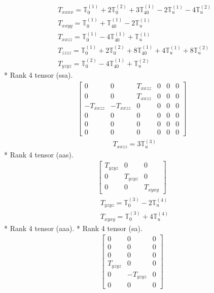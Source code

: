 \documentclass[fleqn,8pt,landscape]{jsarticle}
\begin{document}
\begin{align*}
& T_{xxxx} = \mathbb{T}_{0}^{(1)} + 2 \mathbb{T}_{0}^{(2)} + 3 \mathbb{T}_{40}^{(1)} - 2 \mathbb{T}_{u}^{(1)} - 4 \mathbb{T}_{u}^{(2)} \\
& T_{xxyy} = \mathbb{T}_{0}^{(1)} + \mathbb{T}_{40}^{(1)} - 2 \mathbb{T}_{u}^{(1)} \\
& T_{xxzz} = \mathbb{T}_{0}^{(1)} - 4 \mathbb{T}_{40}^{(1)} + \mathbb{T}_{u}^{(1)} \\
& T_{zzzz} = \mathbb{T}_{0}^{(1)} + 2 \mathbb{T}_{0}^{(2)} + 8 \mathbb{T}_{40}^{(1)} + 4 \mathbb{T}_{u}^{(1)} + 8 \mathbb{T}_{u}^{(2)} \\
& T_{yzyz} = \mathbb{T}_{0}^{(2)} - 4 \mathbb{T}_{40}^{(1)} + \mathbb{T}_{u}^{(2)}
\end{align*}
* Rank 4 tensor (ssa).
\begin{align*}
\begin{bmatrix} 0 & 0 & T_{xxzz} & 0 & 0 & 0 \\ 0 & 0 & T_{xxzz} & 0 & 0 & 0 \\ - T_{xxzz} & - T_{xxzz} & 0 & 0 & 0 & 0 \\ 0 & 0 & 0 & 0 & 0 & 0 \\ 0 & 0 & 0 & 0 & 0 & 0 \\ 0 & 0 & 0 & 0 & 0 & 0 \end{bmatrix}
\end{align*}
\begin{align*}
& T_{xxzz} = 3 \mathbb{T}_{u}^{(3)}
\end{align*}
* Rank 4 tensor (aas).
\begin{align*}
\begin{bmatrix} T_{yzyz} & 0 & 0 \\ 0 & T_{yzyz} & 0 \\ 0 & 0 & T_{xyxy} \end{bmatrix}
\end{align*}
\begin{align*}
& T_{yzyz} = \mathbb{T}_{0}^{(3)} - 2 \mathbb{T}_{u}^{(4)} \\
& T_{xyxy} = \mathbb{T}_{0}^{(3)} + 4 \mathbb{T}_{u}^{(4)}
\end{align*}
* Rank 4 tensor (aaa).
* Rank 4 tensor (sa).
\begin{align*}
\begin{bmatrix} 0 & 0 & 0 \\ 0 & 0 & 0 \\ 0 & 0 & 0 \\ T_{yzyz} & 0 & 0 \\ 0 & - T_{yzyz} & 0 \\ 0 & 0 & 0 \end{bmatrix}
\end{align*}
\end{document}
